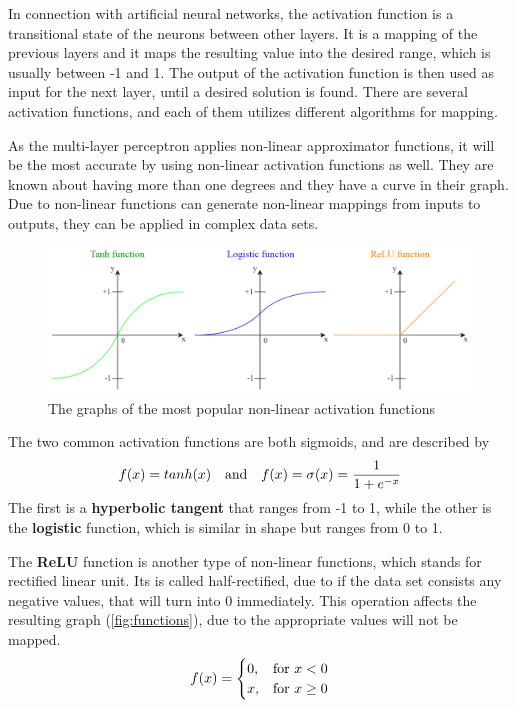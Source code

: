 In connection with artificial neural networks, the activation function is a transitional state of the neurons between other layers. It is a mapping of the previous layers and it maps the resulting value into the desired range, which is usually between -1 and 1. The output of the activation function is then used as input for the next layer, until a desired solution is found. There are several activation functions, and each of them utilizes different algorithms for mapping. \medskip

As the multi-layer perceptron applies non-linear approximator functions, it will be the most accurate by using non-linear activation functions as well. They are known about having more than one degrees and they have a curve in their graph. Due to non-linear functions can generate non-linear mappings from inputs to outputs, they can be applied in complex data sets. 

\begin{figure}[h]
	\centering
	\includegraphics[height=0.35\linewidth]{./figures/functions}
	\caption{The graphs of the most popular non-linear activation functions}
	\label{fig:functions}
\end{figure}

The two common activation functions are both sigmoids, and are described by
$$ f(x)=tanh(x) ~~~ \hbox{and} ~~~ f(x)=\sigma (x)=\frac{1}{1+e^{-x}} $$
The first is a \textbf{hyperbolic tangent} that ranges from -1 to 1, while the other is the \textbf{logistic} function, which is similar in shape but ranges from 0 to 1. \smallskip

The \textbf{ReLU} function is another type of non-linear functions, which stands for rectified linear unit. Its is called half-rectified, due to if the data set consists any negative values, that will turn into 0 immediately. This operation affects the resulting graph (\autoref{fig:functions}), due to the appropriate values will not be mapped.
$$ f(x) = \begin{cases} 0, & \hbox{for}~ x < 0 \\ x, & \hbox{for}~ x \geq 0 \end{cases} $$



